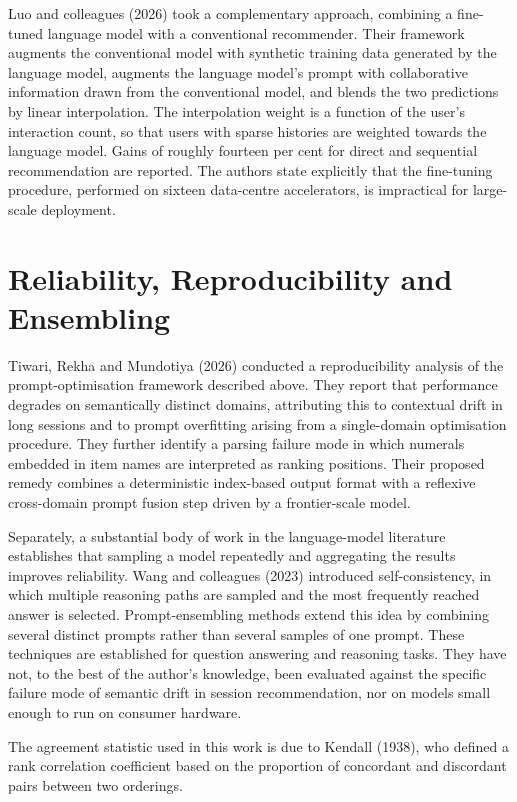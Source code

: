 \documentclass[12pt,a4paper,oneside]{report}
\begin{document}
Luo and colleagues (2026) took a complementary approach, combining a fine-tuned
language model with a conventional recommender. Their framework augments the
conventional model with synthetic training data generated by the language model,
augments the language model's prompt with collaborative information drawn from
the conventional model, and blends the two predictions by linear interpolation.
The interpolation weight is a function of the user's interaction count, so that
users with sparse histories are weighted towards the language model. Gains of
roughly fourteen per cent for direct and sequential recommendation are reported.
The authors state explicitly that the fine-tuning procedure, performed on sixteen
data-centre accelerators, is impractical for large-scale deployment.

\section{Reliability, Reproducibility and Ensembling}

Tiwari, Rekha and Mundotiya (2026) conducted a reproducibility analysis of the
prompt-optimisation framework described above. They report that performance
degrades on semantically distinct domains, attributing this to contextual drift
in long sessions and to prompt overfitting arising from a single-domain
optimisation procedure. They further identify a parsing failure mode in which
numerals embedded in item names are interpreted as ranking positions. Their
proposed remedy combines a deterministic index-based output format with a
reflexive cross-domain prompt fusion step driven by a frontier-scale model.

Separately, a substantial body of work in the language-model literature
establishes that sampling a model repeatedly and aggregating the results
improves reliability. Wang and colleagues (2023) introduced self-consistency, in
which multiple reasoning paths are sampled and the most frequently reached answer
is selected. Prompt-ensembling methods extend this idea by combining several
distinct prompts rather than several samples of one prompt. These techniques are
established for question answering and reasoning tasks. They have not, to the
best of the author's knowledge, been evaluated against the specific failure mode
of semantic drift in session recommendation, nor on models small enough to run
on consumer hardware.

The agreement statistic used in this work is due to Kendall (1938), who defined a
rank correlation coefficient based on the proportion of concordant and discordant
pairs between two orderings.
\end{document}
